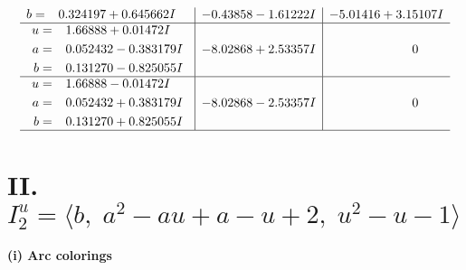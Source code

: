 \documentclass[1p]{elsarticle_modified}
\theoremstyle{definition}
\begin{document}
$$\begin{array}{c|c|c}
\begin{aligned}
b &= \phantom{-}0.324197 + 0.645662 I\end{aligned}
 & -0.43858 - 1.61222 I & -5.01416 + 3.15107 I \\ \hline\begin{aligned}
u &= \phantom{-}1.66888 + 0.01472 I \\
a &= \phantom{-}0.052432 - 0.383179 I \\
b &= \phantom{-}0.131270 - 0.825055 I\end{aligned}
 & -8.02868 + 2.53357 I & \phantom{-0.000000 } 0 \\ \hline\begin{aligned}
u &= \phantom{-}1.66888 - 0.01472 I \\
a &= \phantom{-}0.052432 + 0.383179 I \\
b &= \phantom{-}0.131270 + 0.825055 I\end{aligned}
 & -8.02868 - 2.53357 I & \phantom{-0.000000 } 0\\
 \hline 
 \end{array}$$\newpage\newpage\renewcommand{\arraystretch}{1}
\centering \section*{II. $I^u_{2}= \langle b,\;a^2- a u+a- u+2,\;u^2- u-1 \rangle$}
\flushleft \textbf{(i) Arc colorings}\\
\end{document}
